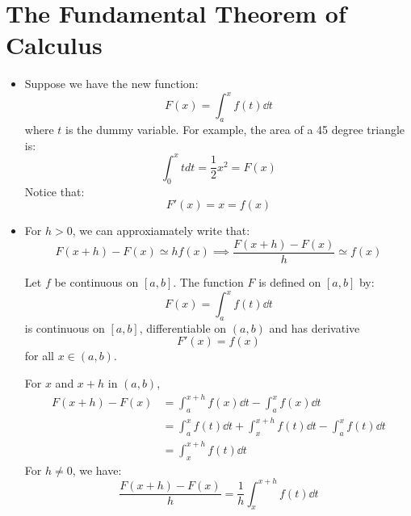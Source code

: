 \section{The Fundamental Theorem of Calculus}
\begin{itemize}
    \item Suppose we have the new function:
    \begin{equation}
        F(x) = \int_a^x f(t) \dd{t}
        \label{eq:}
    \end{equation}
    where $t$ is the dummy variable. For example, the area of a 45 degree triangle is:
    \begin{equation}
        \int_0^x t dt = \frac{1}{2}x^2 = F(x)
        \label{eq:}
    \end{equation}
    Notice that:
    \begin{equation}
        F'(x) = x = f(x)
        \label{eq:}
    \end{equation}
    \item For $h>0$, we can approxiamately write that:
    \begin{equation}
        F(x+h)-F(x) \simeq hf(x) \implies \frac{F(x+h)-F(x)}{h} \simeq f(x)
        \label{eq:}
    \end{equation}
    \begin{theorem}
        Let $f$ be continuous on $[a,b]$. The function $F$ is defined on $[a,b]$ by:
        \begin{equation}
            F(x)=\int_a^x f(t) \dd{t}
            \label{eq:}
        \end{equation}
        is continuous on $[a,b]$, differentiable on $(a,b)$ and has derivative
        \begin{equation}
            F'(x) = f(x)
            \label{eq:}
        \end{equation}
        for all $x\in (a,b)$.
    \end{theorem}
    \begin{prooof}
        For $x$ and $x+h$ in $(a,b)$,
        \begin{align}
            F(x+h)-F(x) &= \int_a^{x+h} f(x) \dd{t} - \int_a^x f(x) \dd{t} \\ 
            &= \int_a^x f(t)\dd{t} + \int_x^{x+h}f(t)\dd{t}-\int_a^x f(t)\dd{t} \\ 
            &= \int_x^{x+h} f(t) \dd{t}
        \end{align}
        For $h\neq 0$, we have:
        \begin{equation}
            \frac{F(x+h)-F(x)}{h}=\frac{1}{h}\int_x^{x+h}f(t)\dd{t}

\end{equation}
\end{prooof}
\end{itemize}
